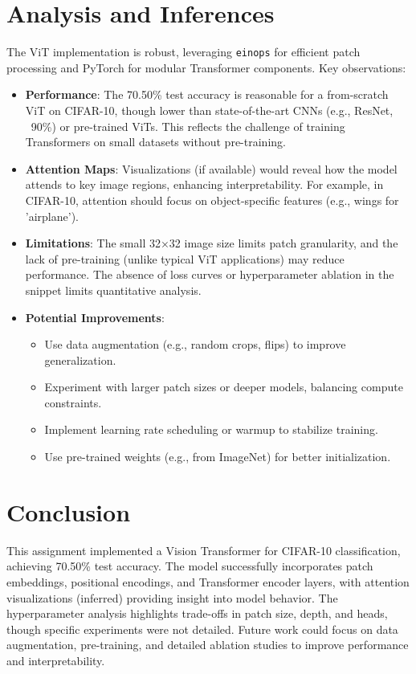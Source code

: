 \documentclass{article}
\begin{document}
\section{Analysis and Inferences}
The ViT implementation is robust, leveraging \texttt{einops} for efficient patch processing and PyTorch for modular Transformer components. Key observations:

\begin{itemize}
    \item \textbf{Performance}: The 70.50\% test accuracy is reasonable for a from-scratch ViT on CIFAR-10, though lower than state-of-the-art CNNs (e.g., ResNet, ~90\%) or pre-trained ViTs. This reflects the challenge of training Transformers on small datasets without pre-training.
    \item \textbf{Attention Maps}: Visualizations (if available) would reveal how the model attends to key image regions, enhancing interpretability. For example, in CIFAR-10, attention should focus on object-specific features (e.g., wings for 'airplane').
    \item \textbf{Limitations}: The small 32×32 image size limits patch granularity, and the lack of pre-training (unlike typical ViT applications) may reduce performance. The absence of loss curves or hyperparameter ablation in the snippet limits quantitative analysis.
    \item \textbf{Potential Improvements}:
    \begin{itemize}
        \item Use data augmentation (e.g., random crops, flips) to improve generalization.
        \item Experiment with larger patch sizes or deeper models, balancing compute constraints.
        \item Implement learning rate scheduling or warmup to stabilize training.
        \item Use pre-trained weights (e.g., from ImageNet) for better initialization.
    \end{itemize}
\end{itemize}

\section{Conclusion}
This assignment implemented a Vision Transformer for CIFAR-10 classification, achieving 70.50\% test accuracy. The model successfully incorporates patch embeddings, positional encodings, and Transformer encoder layers, with attention visualizations (inferred) providing insight into model behavior. The hyperparameter analysis highlights trade-offs in patch size, depth, and heads, though specific experiments were not detailed. Future work could focus on data augmentation, pre-training, and detailed ablation studies to improve performance and interpretability.
\end{document}
